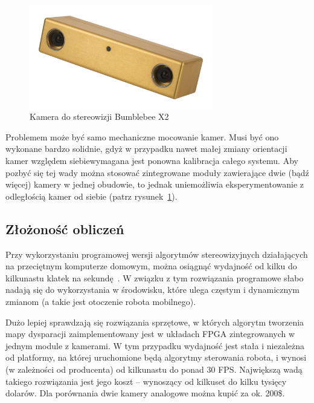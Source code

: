 \begin{figure}[h!]
\centering
\includegraphics[width=8cm]{../../Common/img/bumblebee}
\caption{Kamera do stereowizji Bumblebee X2}
\label{fig:bumblebee}
\end{figure}

Problemem może być samo mechaniczne mocowanie kamer. Musi być ono wykonane
bardzo solidnie, gdyż w przypadku nawet małej zmiany orientacji kamer względem
siebiewymagana jest ponowna kalibracja całego systemu. Aby pozbyć się tej wady
można stosować zintegrowane moduły zawierające dwie (bądź więcej) kamery w
jednej obudowie, to jednak uniemożliwia eksperymentowanie z odległością kamer
od siebie (patrz rysunek~\ref{fig:bumblebee}).

\subsection{Złożoność obliczeń}


Przy wykorzystaniu programowej wersji algorytmów stereowizyjnych działających
na przeciętnym komputerze domowym, można osiągnąć wydajność od kilku do
kilkunastu klatek na sekundę~\cite{4670774, Hirschmuller:2008:SPS:1340087.1340245}.
W związku z tym rozwiązania programowe słabo nadają się do wykorzystania w środowisku,
które ulega częstym i dynamicznym zmianom (a takie jest otoczenie robota mobilnego).

Dużo lepiej sprawdzają się rozwiązania sprzętowe, w których algorytm tworzenia
mapy dysparacji zaimplementowany jest w układach FPGA zintegrowanych w jednym
module z kamerami. W tym przypadku wydajność jest stała i niezależna od platformy,
na której uruchomione będą algorytmy sterowania robota, i wynosi (w zależności
od producenta) od kilkunastu do ponad 30 FPS. Największą wadą takiego rozwiązania
jest jego koszt -- wynoszący od kilkuset do kilku tysięcy dolarów. Dla porównania
dwie kamery analogowe można kupić za ok. 200\$.

